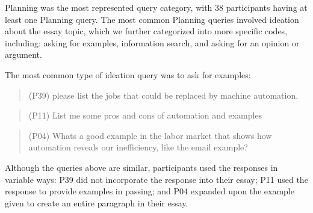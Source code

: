 \documentclass[manuscript,screen,acmsmall]{acmart}
\begin{document}
        Planning was the most represented query category, with 38 participants having at least one Planning query. 
        The most common Planning queries involved ideation about the essay topic, which we further categorized into more specific codes, including: asking for examples, information search, and asking for an opinion or argument.
        
        The most common type of ideation query was to ask for examples:
        \begin{quote}
            (P39) please list the jobs that could be replaced by machine automation.
        \end{quote}
        \begin{quote}
            (P11) List me some pros and cons of automation and examples
        \end{quote}
        \begin{quote}
            (P04) Whats a good example in the labor market that shows how automation reveals our inefficiency, like the email example?
        \end{quote}
        Although the queries above are similar, participants used the responses in variable ways: P39 did not incorporate the response into their essay; P11 used the response to provide examples in passing; and P04 expanded upon the example given to create an entire paragraph in their essay.
    
\end{document}
